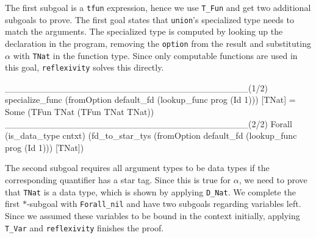 \documentclass[fleqn]{scrreprt}
\newcommand{\coqinline}[1]{\texttt{#1}}
\begin{document}
The first subgoal is a \coqinline{tfun} expression, hence we use \coqinline{T_Fun} and get two additional subgoals to prove. The first goal states that \texttt{union}'s specialized type needs to match the arguments. The specialized type is computed by looking up the declaration in the program, removing the \coqinline{option} from the result and substituting $\alpha$ with \coqinline{TNat} in the function type. Since only computable functions are used in this goal, \coqinline{reflexivity} solves this directly.
\begin{coqcode}
______________________________________(1/2)
specialize_func (fromOption default_fd (lookup_func prog (Id 1))) [TNat] =
Some (TFun TNat (TFun TNat TNat))
______________________________________(2/2)
Forall (is_data_type cntxt)
(fd_to_star_tys (fromOption default_fd (lookup_func prog (Id 1))) [TNat])
\end{coqcode}
The second subgoal requires all argument types to be data types if the corresponding quantifier has a star tag. Since this is true for $\alpha$, we need to prove that \coqinline{TNat} is a data type, which is shown by applying \coqinline{D_Nat}. We complete the first $*$-subgoal with \coqinline{Forall_nil} and have two subgoals regarding variables left. Since we assumed these variables to be bound in the context initially, applying \coqinline{T_Var} and \coqinline{reflexivity} finishes the proof.
\end{document}
